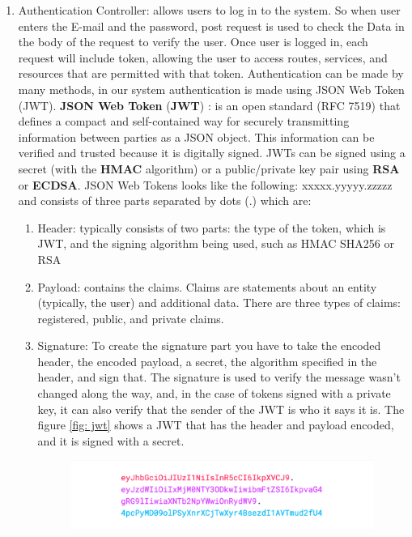 \begin{enumerate}
    \item Authentication Controller: allows users to log in to the system. So when user enters the E-mail and the password, post request is used to check the Data in the body of the request to verify the user.
Once user is logged in, each request will include token, allowing the user to access routes, services, and resources that are permitted with that token. 
Authentication can be made by many methods, in our system authentication is made using JSON Web Token (JWT).\newline \hfill \break
\textbf{JSON Web Token} (\textbf{JWT}) \cite{JWT}:
is an open standard (RFC 7519) that defines a compact and self-contained way for securely transmitting information between parties as a JSON object. This information can be verified and trusted because it is digitally signed. JWTs can be signed using a secret (with the \textbf{HMAC} algorithm) or a public/private key pair using \textbf{RSA} or \textbf{ECDSA}.\newline
JSON Web Tokens looks like the following: xxxxx.yyyyy.zzzzz and consists of three parts separated by dots (.) which are:
\begin{enumerate}
    \setcounter{enumi}{0}
    \item Header: typically consists of two parts: the type of the token, which is JWT, and the signing algorithm being used, such as HMAC SHA256 or RSA
    \item Payload: contains the claims. Claims are statements about an entity (typically, the user) and additional data. There are three types of claims: registered, public, and private claims.
    \item Signature: To create the signature part you have to take the encoded header, the encoded payload, a secret, the algorithm specified in the header, and sign that. The signature is used to verify the message wasn't changed along the way, and, in the case of tokens signed with a private key, it can also verify that the sender of the JWT is who it says it is.
    The figure \ref{fig: jwt} shows a JWT that has the header and payload encoded, and it is signed with a secret.
    \begin{figure}[htp]%
    \center%
    \includegraphics[width=1\textwidth]{images/Software/encoded-jwt3.png}%

\end{figure}
\end{enumerate}
\end{enumerate}
